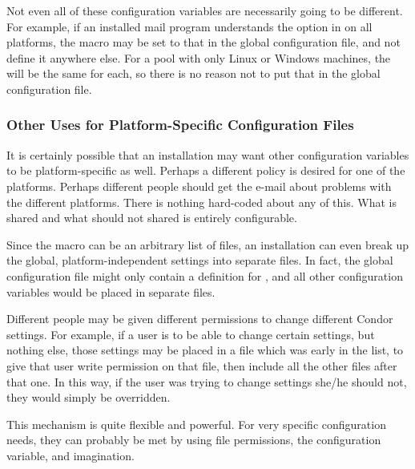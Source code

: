 Not even all of these configuration variables are necessarily
going to be different.
For example, if an installed mail program understands the
 option in  on all platforms,
the  macro may be set to that in the global configuration
file, and not define it anywhere else.
For a pool with only Linux or Windows machines,
the  will be the same for each, so there is no
reason not to put that in the global configuration file.

\subsubsection{\label{sec:Other-Uses-for-Platform-Files}Other Uses for
Platform-Specific Configuration Files} 

It is certainly possible that an installation may want other 
configuration variables to be platform-specific as well.
Perhaps a different policy is desired for
one of the platforms.
Perhaps different people should get the
e-mail about problems with the different platforms.
There is nothing hard-coded about any of this.
What is shared and
what should not shared is entirely configurable.

Since the  macro can be an arbitrary
list of files, an installation can even break up the global,
platform-independent settings into separate files.
In fact, the global configuration file might
only contain a definition for , and all
other configuration variables would be placed in separate files.  

Different people may be given different permissions to change different
Condor settings.  For example, if a user is to be able to
change certain settings, but nothing else, those
settings may be placed in a file which was early
in the  list,
to give that user write permission on that file, then include all
the other files after that one.  In this way, if the user was trying to
change settings she/he should not, they would simply be overridden.  

This mechanism is quite flexible and powerful.  For
very specific configuration needs, they can probably be met by
using file permissions, the  configuration
variable, and imagination.


